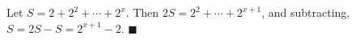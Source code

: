 Let $S=2+2^2+\cdots+2^x$. Then $2S=2^2+\cdots+2^{x+1}$, and subtracting, $S=2S-S=2^{x+1}-2$. $\blacksquare$
